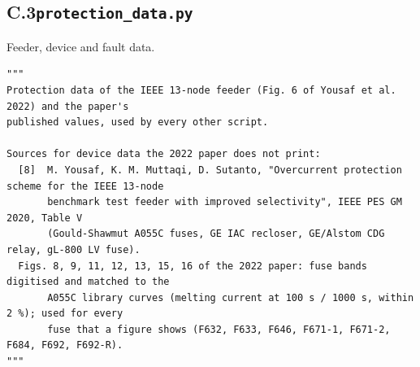\documentclass[12pt,a4paper]{article}
\begin{document}
\subsection*{C.3\quad \texttt{protection\_data.py}}
Feeder, device and fault data.
\begin{lstlisting}
"""
Protection data of the IEEE 13-node feeder (Fig. 6 of Yousaf et al. 2022) and the paper's
published values, used by every other script.

Sources for device data the 2022 paper does not print:
  [8]  M. Yousaf, K. M. Muttaqi, D. Sutanto, "Overcurrent protection scheme for the IEEE 13-node
       benchmark test feeder with improved selectivity", IEEE PES GM 2020, Table V
       (Gould-Shawmut A055C fuses, GE IAC recloser, GE/Alstom CDG relay, gL-800 LV fuse).
  Figs. 8, 9, 11, 12, 13, 15, 16 of the 2022 paper: fuse bands digitised and matched to the
       A055C library curves (melting current at 100 s / 1000 s, within 2 %); used for every
       fuse that a figure shows (F632, F633, F646, F671-1, F671-2, F684, F692, F692-R).
"""


\end{lstlisting}
\end{document}
